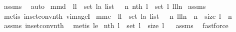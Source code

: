 \begin{isabellebody}
%
\isadelimproof
%
\endisadelimproof
%
\isatagproof
{}\isamarkupfalse%
\ assms\ \isamarkupfalse%
\ auto%
\endisatagproof
{\isafoldproof}%
%
\isadelimproof
\isanewline
%
\endisadelimproof
{}\isamarkupfalse%
\ mm{}{}d{\isacharcolon}\ \ {\isachardoublequoteopen}ll\ {\isasymin}\ set\ {\isacharparenleft}l{\isacharcolon}{\isacharcolon}{\isacharprime}a\ list{\isacharparenright}{\isachardoublequoteclose}\ \ {\isachardoublequoteopen}{\isasymexists}\ n{\isasymin}\ {\isacharparenleft}nth\ l{\isacharparenright}\ {\isacharminus}{\isacharbackquote}\ {\isacharparenleft}set\ l{\isacharparenright}{\isachardot}\ ll{\isacharequal}l{\isacharbang}n{\isachardoublequoteclose}\isanewline
%
\isadelimproof
%
\endisadelimproof
%
\isatagproof
{}\isamarkupfalse%
\ assms{\isacharparenleft}{}{\isacharparenright}\ \isamarkupfalse%
\ {\isacharparenleft}metis\ in{\isacharunderscore}set{\isacharunderscore}conv{\isacharunderscore}nth\ vimageI{}{\isacharparenright}%
\endisatagproof
{\isafoldproof}%
%
\isadelimproof
\isanewline
%
\endisadelimproof
{}\isamarkupfalse%
\ mm{}{}e{\isacharcolon}\ \ {\isachardoublequoteopen}ll\ {\isasymin}\ set\ {\isacharparenleft}l{\isacharcolon}{\isacharcolon}{\isacharprime}a\ list{\isacharparenright}{\isachardoublequoteclose}\ \ {\isachardoublequoteopen}{\isasymexists}\ n{\isachardot}\ ll{\isacharequal}l{\isacharbang}n\ {\isacharampersand}\ n\ {\isacharless}\ size\ l\ {\isacharampersand}\ n\ {\isachargreater}{\isacharequal}\ {}{\isachardoublequoteclose}\isanewline
%
\isadelimproof
%
\endisadelimproof
%
\isatagproof
{}\isamarkupfalse%
\ assms\ in{\isacharunderscore}set{\isacharunderscore}conv{\isacharunderscore}nth\ \isamarkupfalse%
\ {\isacharparenleft}metis\ le{}{\isacharparenright}%
\endisatagproof
{\isafoldproof}%
%
\isadelimproof
\isanewline
%
\endisadelimproof
{}\isamarkupfalse%
\ {\isachardoublequoteopen}{\isacharparenleft}nth\ l{\isacharparenright}\ {\isacharminus}{\isacharbackquote}\ {\isacharparenleft}set\ l{\isacharparenright}\ {\isasymsupseteq}\ {\isacharbraceleft}{}{\isachardot}{\isachardot}{\isacharless}size\ l{\isacharbraceright}{\isachardoublequoteclose}%
\isadelimproof
\ %
\endisadelimproof
%
\isatagproof
{}\isamarkupfalse%
\ assms\ \isamarkupfalse%
\ fastforce%
\endisatagproof
{\isafoldproof}%
%

\end{isabellebody}
